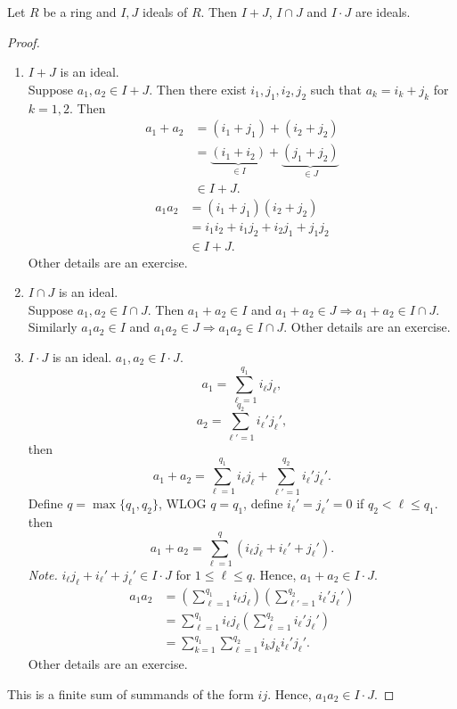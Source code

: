 \documentclass[twoside, openright, fontsize=10pt, headings=big]{scrbook}
\begin{document}
\begin{proposition}{}{}
    Let $R$ be a ring and $I,J$ ideals of $R$. Then $I+J$, $I\cap J$ and $I\cdot J$ are ideals. 
\end{proposition}
\begin{proof}
    \begin{enumerate}
        \item $I+J$ is an ideal. \\
        Suppose $a_1,a_2\in I+J$. Then there exist $i_1,j_1,i_2,j_2$ such that $a_k=i_k+j_k$ for $k=1,2$. Then
        \begin{align*}
            a_1+a_2&=(i_1+j_1)+(i_2+j_2)\\
            &=\underbrace{(i_1+i_2)}_{\in I}+\underbrace{(j_1+j_2)}_{\in J}\\
            &\in I+J.
        \end{align*}
        \begin{align*}
            a_1a_2&=(i_1+j_1)(i_2+j_2)\\
            &=i_1i_2+i_1j_2+i_2j_1+j_1j_2\\
            &\in I+J.
        \end{align*}
        Other details are an exercise.
        \item $I\cap J$ is an ideal.\\
        Suppose $a_1,a_2\in I\cap J$. Then $a_1+a_2\in I$ and $a_1+a_2\in J\Rightarrow a_1+a_2\in I\cap J$. Similarly $a_1a_2\in I$ and $a_1a_2\in J\Rightarrow a_1a_2\in I\cap J$. Other details are an exercise.
        \item $I\cdot J$ is an ideal.
        $a_1,a_2\in I\cdot J$.
        \[
            a_1=\sum_{\ell=1}^{q_1}i_\ell j_\ell,
        \]
        \[
            a_2=\sum_{\ell'=1}^{q_2}i_\ell' j_\ell',
        \]
        then
        \[
            a_1+a_2=\sum_{\ell=1}^{q_1}i_\ell j_\ell+\sum_{\ell'=1}^{q_2}i_\ell' j_\ell'.
        \]
        Define $q=\max\{q_1,q_2\}$, WLOG $q=q_1$, define $i_\ell'=j_\ell'=0$ if $q_2<\ell \leq q_1$. then
        \[
            a_1+a_2=\sum_{\ell=1}^{q}(i_\ell j_\ell+i_\ell'+j_\ell').
        \]
        \textit{Note.} $i_\ell j_\ell+i_\ell'+j_\ell'\in I\cdot J$ for $1\leq \ell\leq q$. Hence, $a_1+a_2\in I\cdot J$.
        \begin{align*}
            a_1a_2&=\left(\sum_{\ell=1}^{q_1}i_\ell j_\ell\right)\left(\sum_{\ell'=1}^{q_2}i_\ell' j_\ell'\right)\\
            &=\sum_{\ell=1}^{q_1}i_\ell j_\ell\left(\sum_{\ell=1}^{q_2}i_\ell'j_\ell'\right)\\
            &=\sum_{k=1}^{q_1}\sum_{\ell=1}^{q_2}i_k j_k i_\ell'j_\ell'.
        \end{align*}
        Other details are an exercise.
    \end{enumerate}
    This is a finite sum of summands of the form $ij$. Hence, $a_1a_2\in I\cdot J$.
\end{proof}
\end{document}
